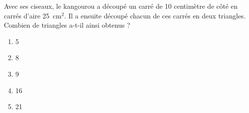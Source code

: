 Avec ses ciseaux, le kangourou a découpé un carré de 10 centimètre de côté en carrés d'aire 25~cm$^2$. Il a ensuite découpé chacun de ces carrés en deux triangles. Combien de triangles a-t-il ainsi obtenus ?
\begin{multicols}{5}
  \begin{enumerate}[A/]
  \item 5
  \item 8
  \item 9
  \item 16
  \item 21
  \end{enumerate}
\end{multicols}